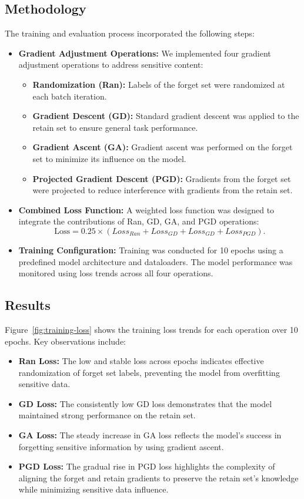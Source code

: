 \documentclass[11pt]{article}
\begin{document}
\subsection{Methodology}
The training and evaluation process incorporated the following steps:
\begin{itemize}
    \item \textbf{Gradient Adjustment Operations:} We implemented four gradient adjustment operations to address sensitive content:
    \begin{itemize}
        \item \textbf{Randomization (Ran):} Labels of the forget set were randomized at each batch iteration.
        \item \textbf{Gradient Descent (GD):} Standard gradient descent was applied to the retain set to ensure general task performance.
        \item \textbf{Gradient Ascent (GA):} Gradient ascent was performed on the forget set to minimize its influence on the model.
        \item \textbf{Projected Gradient Descent (PGD):} Gradients from the forget set were projected to reduce interference with gradients from the retain set.
    \end{itemize}
    \item \textbf{Combined Loss Function:} A weighted loss function was designed to integrate the contributions of Ran, GD, GA, and PGD operations:
    \[
    \text{Loss} = 0.25 \times (Loss_{Ran} + Loss_{GD} + Loss_{GD} + Loss_{PGD}).
    \]
    \item \textbf{Training Configuration:} Training was conducted for 10 epochs using a predefined model architecture and dataloaders. The model performance was monitored using loss trends across all four operations.
\end{itemize}

\subsection{Results}
Figure~\ref{fig:training-loss} shows the training loss trends for each operation over 10 epochs. Key observations include:
\begin{itemize}
    \item \textbf{Ran Loss:} The low and stable loss across epochs indicates effective randomization of forget set labels, preventing the model from overfitting sensitive data.
    \item \textbf{GD Loss:} The consistently low GD loss demonstrates that the model maintained strong performance on the retain set.
    \item \textbf{GA Loss:} The steady increase in GA loss reflects the model's success in forgetting sensitive information by using gradient ascent.
    \item \textbf{PGD Loss:} The gradual rise in PGD loss highlights the complexity of aligning the forget and retain gradients to preserve the retain set's knowledge while minimizing sensitive data influence.
\end{itemize}
\end{document}
